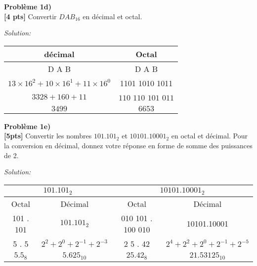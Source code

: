\documentclass{article}
\newenvironment{problem}[2][Problème]
    { \begin{mdframed}[backgroundcolor=gray!20] \textbf{#1 #2} \\}
    {  \end{mdframed}}
\newenvironment{solution}
    {\textit{Solution:}}
    {}
\begin{document}
\begin{problem}{1d)}
\textbf{[4 pts]} Convertir $DAB_{16}$ en décimal et octal.
\end{problem}
\begin{solution}
    \begin{tabular}{c|c}
        décimal & Octal\\
        \hline
        D \hspace{40pt}A\hspace{40pt} B & D\hspace{15pt} A\hspace{15pt} B\\
        $13\times16^2 + 10\times16^1 + 11\times16^0$ & 1101 1010 1011\\
        $3328+160+11$ & $110$ $110$ $101$ $011$\\
        $3499$ & $6653$
        
    \end{tabular}
\end{solution}

\begin{problem}{1e)}
\textbf{[5pts]} Convertir les nombres $101.101_2$ et $10101.10001_2$ en octal et décimal. Pour la conversion en décimal, donnez votre réponse en forme de somme des puissances de 2.
\end{problem}
\begin{solution}
    \begin{tabular}{|c|c|c|c|}
        \hline
        \multicolumn{2}{|c|}{\large $101.101_2$} & \multicolumn{2}{|c|}{\large $10101.10001_2$}\\
        \hline
        Octal & Décimal & Octal & Décimal\\
        \hline
        101 . 101 & $101.101_2$ & 010 101 . 100 010 & 10101.10001 \\
        5  .  5 & $2^2+2^0+2^{-1}+2^{-3}$ & 2 \hspace{12pt}5 . 4\hspace{12pt}2 & $2^4+2^2+2^0+2^{-1}+2^{-5}$  \\
        $5.5_8$&$5.625_{10}$&$25.42_8$&$21.53125_{10}$\\
        \hline
    \end{tabular}
\end{solution}
\end{document}
